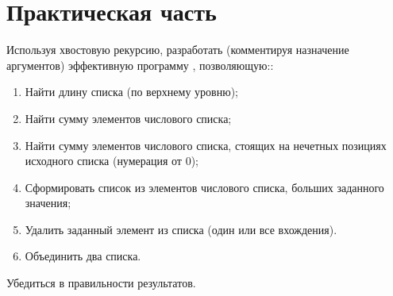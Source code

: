 \chapter{Практическая часть}
Используя хвостовую рекурсию, разработать (комментируя назначение аргументов) эффективную программу , позволяющую::

\begin{enumerate}
	\item Найти длину списка (по верхнему уровню);
	\item Найти сумму элементов числового списка;
	\item Найти сумму элементов числового списка, стоящих на нечетных позициях исходного списка (нумерация от 0);
	\item Сформировать список из элементов числового списка, больших заданного значения;
	\item Удалить заданный элемент из списка (один или все вхождения).
	\item Объединить два списка.
\end{enumerate}
Убедиться в правильности результатов.

